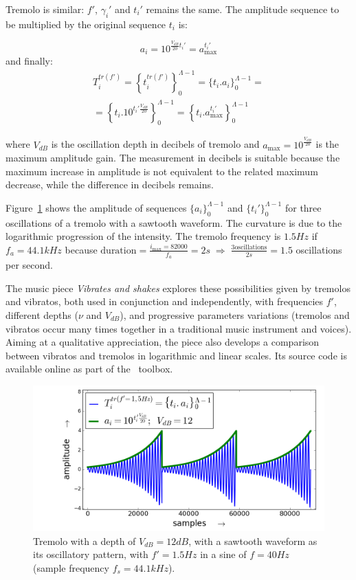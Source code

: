 Tremolo is similar: $f'$, $\gamma_i'$ and $t_i'$ remains the same.
The amplitude sequence to be multiplied by the original sequence $t_i$ is:

\begin{equation}\label{trA}
 a_i=10^{\frac{V_{dB}}{20}t_i' } = a_{\text{max}}^{t_i'}
\end{equation}
\noindent and finally: 
\begin{multline}\label{trT}
 T_i^{tr(f')}=\left \{ t_i^{tr(f')} \right \}_0^{\Lambda-1}=\{ t_i . a_i \}_0^{\Lambda-1}= \\ =\left \{t_i .10^{t_i' \frac{V_{dB}}{20}}    \right \}_0^{\Lambda-1}=\left\{t_i . a_{\text{max}}^{t_i'} \right\}_0^{\Lambda-1}
\end{multline}

\noindent where $V_{dB}$ is the oscillation depth in decibels of tremolo and $a_{\text{max}}=10^{\frac{V_{dB}}{20}}$ is the maximum amplitude gain. The measurement in decibels is suitable because the maximum increase in amplitude is not equivalent to the related maximum decrease, while the difference in decibels remains.

Figure~\ref{fig:tremolo} shows the amplitude of sequences $\{a_i\}_0^{\Lambda-1}$ and $\{t_i'\}_0^{\Lambda-1}$ for three oscillations of a tremolo with a sawtooth waveform. The curvature is due to the logarithmic progression of the intensity. The tremolo frequency is $1.5Hz$ if $f_a=44.1kHz$ because $\text{duration} = \frac{i_{\text{max}}=82000}{f_a}= 2s \; \Rightarrow \; \frac{3\text{oscillations}}{2s}=1.5$ oscillations per second.

The music piece \emph{Vibrates and shakes} explores these possibilities given by tremolos and vibratos, both used in conjunction and independently, with frequencies $f'$, different depths ($\nu$ and $V_{dB}$), and progressive parameters variations (tremolos and vibratos occur many times together in a traditional music instrument and voices). Aiming at a qualitative appreciation, the piece also develops a comparison between vibratos and tremolos in logarithmic and linear scales. Its source code is available online as part of the \massa\ toolbox.

\begin{figure}
     \centering
         \includegraphics[width=\textwidth]{figures/tremolo_}
     \caption{Tremolo with a depth of $V_{dB}=12dB$, with a sawtooth waveform as its oscillatory pattern, with $f'=1.5Hz$ in a sine of $f=40Hz$ (sample frequency $f_s=44.1kHz$).}
         \label{fig:tremolo}
\end{figure}

